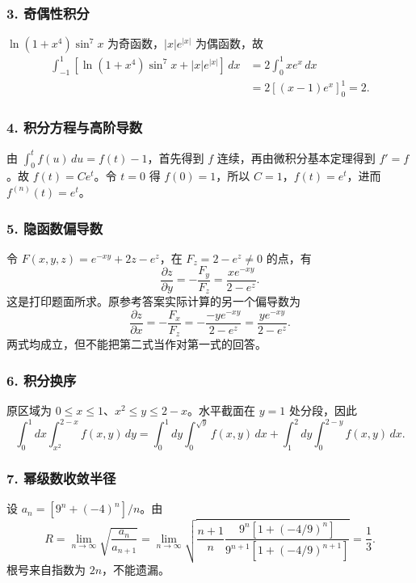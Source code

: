 \documentclass[11pt,fontset=fandol]{ctexart}
\begin{document}
\subsubsection{3. 奇偶性积分}\label{ux5947ux5076ux6027ux79efux5206}

\(\ln(1+x^4)\sin^7x\) 为奇函数，\(|x|e^{|x|}\) 为偶函数，故 \[
\begin{aligned}
\int_{-1}^1[\ln(1+x^4)\sin^7x+|x|e^{|x|}]\,dx
&=2\int_0^1xe^x\,dx\\
&=2[(x-1)e^x]_0^1=2.
\end{aligned}
\]

\subsubsection{4.
积分方程与高阶导数}\label{ux79efux5206ux65b9ux7a0bux4e0eux9ad8ux9636ux5bfcux6570}

由 \(\int_0^tf(u)\,du=f(t)-1\)，首先得到 \(f\)
连续，再由微积分基本定理得到 \(f'=f\)。故 \(f(t)=Ce^t\)。令 \(t=0\) 得
\(f(0)=1\)，所以 \(C=1\)，\(f(t)=e^t\)，进而 \(f^{(n)}(t)=e^t\)。

\subsubsection{5.
隐函数偏导数}\label{ux9690ux51fdux6570ux504fux5bfcux6570}

令 \(F(x,y,z)=e^{-xy}+2z-e^z\)，在 \(F_z=2-e^z\ne0\) 的点，有 \[
\frac{\partial z}{\partial y}=-\frac{F_y}{F_z}
=\frac{xe^{-xy}}{2-e^z}.
\] 这是打印题面所求。原参考答案实际计算的另一个偏导数为 \[
\frac{\partial z}{\partial x}=-\frac{F_x}{F_z}
=-\frac{-ye^{-xy}}{2-e^z}=\frac{ye^{-xy}}{2-e^z}.
\] 两式均成立，但不能把第二式当作对第一式的回答。

\subsubsection{6. 积分换序}\label{ux79efux5206ux6362ux5e8f}

原区域为 \(0\le x\le1\)、\(x^2\le y\le2-x\)。水平截面在 \(y=1\)
处分段，因此 \[
\int_0^1dx\int_{x^2}^{2-x}f(x,y)\,dy
=\int_0^1dy\int_0^{\sqrt y}f(x,y)\,dx
+\int_1^2dy\int_0^{2-y}f(x,y)\,dx.
\]

\subsubsection{7.
幂级数收敛半径}\label{ux5e42ux7ea7ux6570ux6536ux655bux534aux5f84}

设 \(a_n=[9^n+(-4)^n]/n\)。由 \[
R=\lim_{n\to\infty}\sqrt{\frac{a_n}{a_{n+1}}}
=\lim_{n\to\infty}\sqrt{\frac{n+1}{n}\frac{9^n[1+(-4/9)^n]}{9^{n+1}[1+(-4/9)^{n+1}]}}
=\frac13.
\] 根号来自指数为 \(2n\)，不能遗漏。
\end{document}
